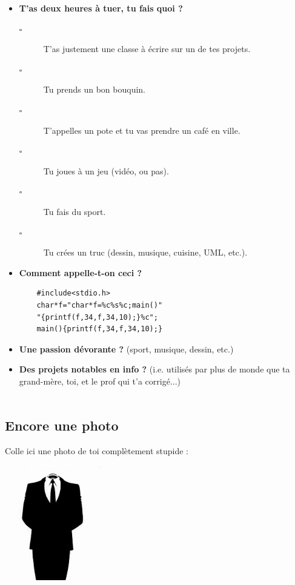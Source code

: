 \begin{itemize}
    \item \textbf{T'as deux heures à tuer, tu fais quoi ?}
    \begin{description}
	\item[$\square$] T'as justement une classe à écrire sur un de tes projets.
	\item[$\square$] Tu prends un bon bouquin.
	\item[$\square$] T'appelles un pote et tu vas prendre un café en ville.
	\item[$\square$] Tu joues à un jeu (vidéo, ou pas).
	\item[$\square$] Tu fais du sport.
	\item[$\square$] Tu crées un truc (dessin, musique, cuisine, UML, etc.).
    \end{description}
	\vspace{1em}
	
    \item \textbf{Comment appelle-t-on ceci ?}
    \begin{verbatim}
	#include<stdio.h>
	char*f="char*f=%c%s%c;main()"
	"{printf(f,34,f,34,10);}%c";
	main(){printf(f,34,f,34,10);}
    \end{verbatim}
    \vspace{4cm}
	
    \item \textbf{Une passion dévorante ?} (sport, musique, dessin, etc.)
    \vspace{4cm}
	
    \item \textbf{Des projets notables en info ?} (i.e. utilisés par plus de monde que ta grand-mère, toi, et le prof qui t'a corrigé...)
    ~\\
	~\\
    \vspace{2cm}
\end{itemize}

\subsection*{Encore une photo}
Colle ici une photo de toi complètement stupide :
\begin{center}
\includegraphics[height=5cm, angle=120]{images/anonymous.jpg}
\end{center}


